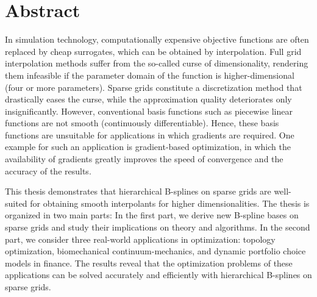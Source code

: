 
\disableornamentsfornextheadingtrue
\section*{Abstract}

In simulation technology, computationally expensive objective functions
are often replaced by cheap surrogates,
which can be obtained by interpolation.
Full grid interpolation methods suffer from the
so-called curse of dimensionality,
rendering them infeasible if the parameter domain of the function
is higher-dimensional (four or more parameters).
Sparse grids constitute a discretization method that drastically eases the
curse, while the approximation quality deteriorates only insignificantly.
However, conventional basis functions such as piecewise linear functions
are not smooth (continuously differentiable).
Hence, these basis functions are unsuitable for applications
in which gradients are required.
One example for such an application is gradient-based optimization,
in which the availability of gradients greatly improves the speed of
convergence and the accuracy of the results.

This thesis demonstrates that hierarchical B-splines on sparse grids are
well-suited for obtaining smooth interpolants for higher dimensionalities.
The thesis is organized in two main parts:
In the first part, we derive new B-spline bases on sparse grids and study
their implications on theory and algorithms.
In the second part, we consider three real-world applications in optimization:
topology optimization, biomechanical continuum-mechanics, and
dynamic portfolio choice models in finance.
The results reveal that the optimization problems of these applications
can be solved accurately and efficiently with hierarchical B-splines on
sparse grids.

\newpage

